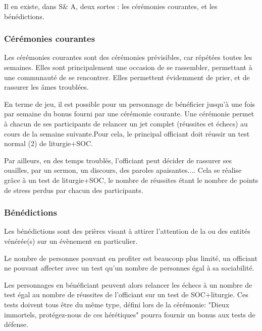 \documentclass[10pt,a4paper,twocolumn]{book}
\begin{document}
Il en existe, dans S\& A, deux sortes : les cérémonies courantes, et les bénédictions.

\subsubsection{Cérémonies courantes}
Les cérémonies courantes sont des cérémonies prévisibles, car répétées toutes les semaines. Elles sont principalement une occasion de se rassembler, permettant à une communauté de se rencontrer. Elles permettent évidemment de prier, et de rassurer les âmes troublées.

En terme de jeu, il est possible pour un personnage de bénéficier jusqu'à une fois par semaine du bonus fourni par une cérémonie courante. Une cérémonie permet à chacun de ses participants de relancer un jet complet (réussites et échecs) au cours de la semaine suivante.Pour cela, le principal officiant doit réussir un test normal (2) de liturgie+SOC.

Par ailleurs, en des temps troublés, l'officiant peut décider de rassurer ses ouailles, par un sermon, un discours, des paroles apaisantes.... Cela se réalise grâce à un test de liturgie+SOC, le nombre de réussites étant le nombre de points de stress perdus par chacun des participants.
\subsubsection{Bénédictions}
Les bénédictions sont des prières visant à attirer l'attention de la ou des entités vénérée(s) sur un évènement en particulier.

Le nombre de personnes pouvant en profiter est beaucoup plus limité, un officiant ne pouvant affecter avec un test qu'un nombre de personnes égal à sa sociabilité. 

Les personnages en bénéficiant peuvent alors relancer les échecs à un nombre de test égal au nombre de réussites de l'officiant sur un test de SOC+liturgie. Ces tests doivent tous être du même type, défini lors de la cérémonie: "Dieux immortels, protégez-nous de ces hérétiques" pourra fournir un bonus aux tests de défense.
\end{document}
